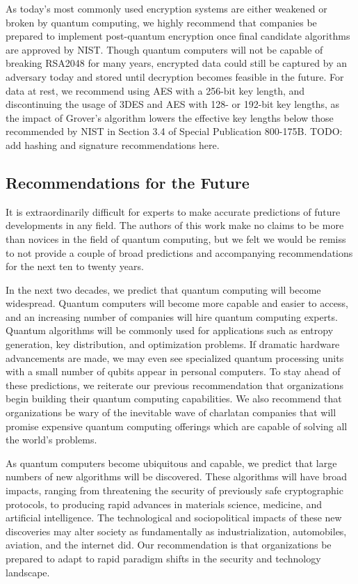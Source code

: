 \documentclass[sigconf]{acmart}
\begin{document}
As today's most commonly used encryption systems are either weakened or broken by quantum computing, we highly recommend that companies be prepared to implement post-quantum encryption once final candidate algorithms are approved by NIST. Though quantum computers will not be capable of breaking RSA2048 for many years, encrypted data could still be captured by an adversary today and stored until decryption becomes feasible in the future. For data at rest, we recommend using AES with a 256-bit key length, and discontinuing the usage of 3DES and AES with 128- or 192-bit key lengths, as the impact of Grover's algorithm lowers the effective key lengths below those recommended by NIST in Section 3.4 of Special Publication 800-175B\cite{barker_guideline_2020}. TODO: add hashing and signature recommendations here.

\subsection{Recommendations for the Future}
It is extraordinarily difficult for experts to make accurate predictions of future developments in any field. The authors of this work make no claims to be more than novices in the field of quantum computing, but we felt we would be remiss to not provide a couple of broad predictions and accompanying recommendations for the next ten to twenty years.

In the next two decades, we predict that quantum computing will become widespread. Quantum computers will become more capable and easier to access, and an increasing number of companies will hire quantum computing experts. Quantum algorithms will be commonly used for applications such as entropy generation, key distribution, and optimization problems. If dramatic hardware advancements are made, we may even see specialized quantum processing units with a small number of qubits appear in personal computers. To stay ahead of these predictions, we reiterate our previous recommendation that organizations begin building their quantum computing capabilities. We also recommend that organizations be wary of the inevitable wave of charlatan companies that will promise expensive quantum computing offerings which are capable of solving all the world's problems.

As quantum computers become ubiquitous and capable, we predict that large numbers of new algorithms will be discovered. These algorithms will have broad impacts, ranging from threatening the security of previously safe cryptographic protocols, to producing rapid advances in materials science, medicine, and artificial intelligence. The technological and sociopolitical impacts of these new discoveries may alter society as fundamentally as industrialization, automobiles, aviation, and the internet did. Our recommendation is that organizations be prepared to adapt to rapid paradigm shifts in the security and technology landscape.
\end{document}
